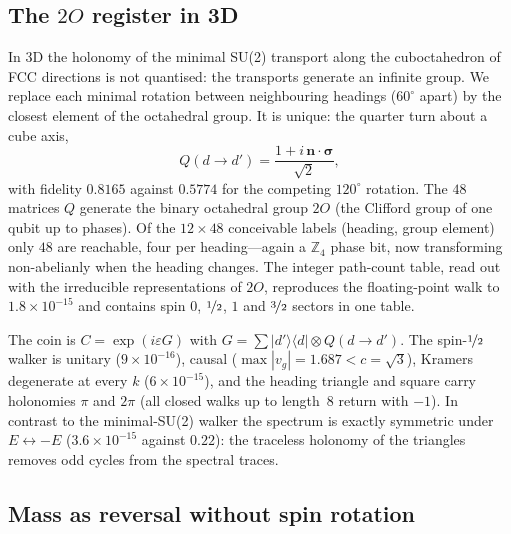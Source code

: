 \documentclass[twocolumn,showpacs,preprintnumbers,amsmath,amssymb]{revtex4-2}
\newcommand{\eps}{\varepsilon}
\newcommand{\Ot}{2O}
\newcommand{\vsig}{\boldsymbol{\sigma}}
\begin{document}
\subsection{The $\Ot$ register in 3D}

In 3D the holonomy of the minimal SU(2) transport along the cuboctahedron of
FCC directions is not quantised: the transports generate an infinite group.
We replace each minimal rotation between neighbouring headings ($60^\circ$
apart) by the closest element of the octahedral group.
It is unique: the quarter turn about a cube axis,
\begin{equation}
  Q(d\!\to\!d') = \frac{1+i\,\mathbf{n}\cdot\vsig}{\sqrt2},
  \label{eq:Q}
\end{equation}
with fidelity $0.8165$ against $0.5774$ for the competing $120^\circ$ rotation.
The $48$ matrices $Q$ generate the binary octahedral group $\Ot$ (the Clifford
group of one qubit up to phases).
Of the $12\times48$ conceivable labels (heading, group element) only $48$ are
reachable, four per heading---again a $\mathbb{Z}_4$ phase bit, now
transforming non-abelianly when the heading changes.
The integer path-count table, read out with the irreducible representations of
$\Ot$, reproduces the floating-point walk to $1.8\times10^{-15}$ and contains
spin $0$, $\nicefrac12$, $1$ and $\nicefrac32$ sectors in one table.

The coin is $C=\exp(i\eps G)$ with $G=\sum|d'\rangle\langle d|\otimes Q(d\!\to\!d')$.
The spin-$\nicefrac12$ walker is unitary ($9\times10^{-16}$), causal
($\max|v_g|=1.687<c=\sqrt3$), Kramers degenerate at every $k$
($6\times10^{-15}$), and the heading triangle and square carry holonomies
$\pi$ and $2\pi$ (all closed walks up to length~$8$ return with $-1$).
In contrast to the minimal-SU(2) walker the spectrum is exactly symmetric under
$E\leftrightarrow-E$ ($3.6\times10^{-15}$ against $0.22$): the traceless
holonomy of the triangles removes odd cycles from the spectral traces.

\subsection{Mass as reversal without spin rotation}
\end{document}
